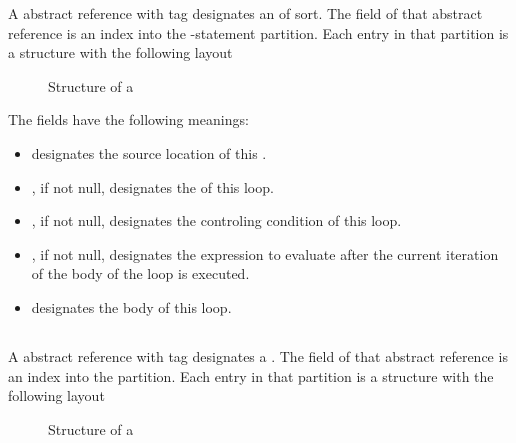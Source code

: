 A  abstract reference with tag  designates an  of  sort.
The  field of that abstract reference is an index into the -statement partition.
Each entry in that partition is a structure with the following layout
%
\begin{figure}[H]
	\centering
	\caption{Structure of a  }
	\label{fig:ifc-for-stmt-structure}
\end{figure}
%
The fields have the following meanings:
\begin{itemize}
	\item {} designates the source location of this  .
	\item {}, if not null, designates the  of this  loop.
	\item {}, if not null, designates the controling condition of this  loop.
	\item {}, if not null, designates the expression to evaluate after the current iteration of the body of the  loop is executed.
	\item {} designates the body of this  loop.
\end{itemize}



\subsection{}
\label{sec:ifc:StmtSort:Labeled}

A  abstract reference with tag  designates a .
The  field of that abstract reference is an index into the  partition.
Each entry in that partition is a structure with the following layout
%
\begin{figure}[H]
	\centering
	\caption{Structure of a }
	\label{fig:ifc-labeled-stmt-structure}
\end{figure}

